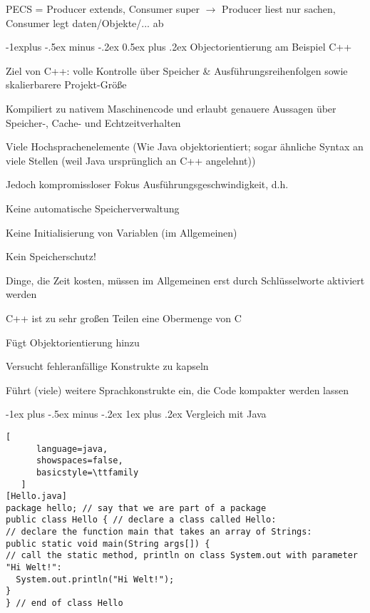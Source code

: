 \documentclass[10pt]{article}
\makeatletter
\renewcommand{\subsection}{\@startsection{subsection}{2}{0mm}%
                                {-1explus -.5ex minus -.2ex}%
                                {0.5ex plus .2ex}%
                                {\normalfont\normalsize\bfseries}}
\renewcommand{\subsubsection}{\@startsection{subsubsection}{3}{0mm}%
                                {-1ex plus -.5ex minus -.2ex}%
                                {1ex plus .2ex}%
                                {\normalfont\small\bfseries}}
\makeatother
\begin{document}
PECS = Producer extends, Consumer super $\rightarrow$ Producer liest nur sachen, Consumer legt daten/Objekte/... ab


\subsection{Objectorientierung am Beispiel C++}
\begin{itemize*}
  \item Ziel von C++: volle Kontrolle über Speicher \& Ausführungsreihenfolgen sowie skalierbarere Projekt-Größe
  \item Kompiliert zu nativem Maschinencode und erlaubt genauere Aussagen über Speicher-, Cache- und Echtzeitverhalten
  \item Viele Hochsprachenelemente (Wie Java objektorientiert; sogar ähnliche Syntax an viele Stellen (weil Java ursprünglich an C++ angelehnt))
  \item Jedoch kompromissloser Fokus Ausführungsgeschwindigkeit, d.h.
  \begin{itemize*}
    \item Keine automatische Speicherverwaltung
    \item Keine Initialisierung von Variablen (im Allgemeinen)
    \item Kein Speicherschutz!
    \item Dinge, die Zeit kosten, müssen im Allgemeinen erst durch Schlüsselworte aktiviert werden
  \end{itemize*}
  \item C++ ist zu sehr großen Teilen eine Obermenge von C
  \begin{itemize*}
    \item Fügt Objektorientierung hinzu
    \item Versucht fehleranfällige Konstrukte zu kapseln
    \item Führt (viele) weitere Sprachkonstrukte ein, die Code kompakter werden lassen
  \end{itemize*}
\end{itemize*}

\subsubsection{Vergleich mit Java}
\begin{lstlisting}[
      language=java,
      showspaces=false,
      basicstyle=\ttfamily
   ]
[Hello.java] 
package hello; // say that we are part of a package
public class Hello { // declare a class called Hello:
// declare the function main that takes an array of Strings:
public static void main(String args[]) {
// call the static method, println on class System.out with parameter "Hi Welt!":
  System.out.println("Hi Welt!");
}
} // end of class Hello
\end{lstlisting}
\end{document}
